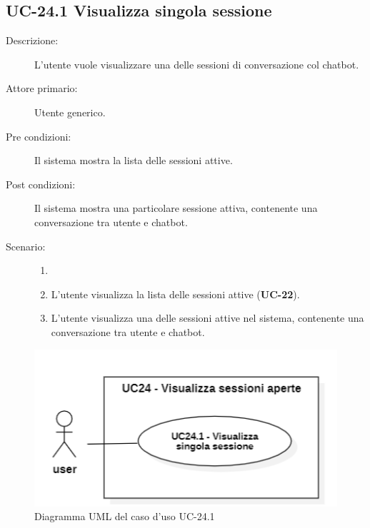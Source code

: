 \subsection{UC-24.1 Visualizza singola sessione}
\begin{description}
    \item[Descrizione:] L'utente vuole visualizzare una delle sessioni di conversazione col chatbot.
    \item[Attore primario:] Utente generico.
    \item[Pre condizioni:] Il sistema mostra la lista delle sessioni attive.
    \item[Post condizioni:] Il sistema mostra una particolare sessione attiva, contenente una conversazione tra utente e chatbot.
    \item[Scenario:] 
    \begin{enumerate}
        \item[]
        \item L'utente visualizza la lista delle sessioni attive (\textbf{UC-22}).
        \item L'utente visualizza una delle sessioni attive nel sistema, contenente una conversazione tra utente e chatbot.
    \end{enumerate}
\end{description}

\begin{figure}[H]
    \centering
    \includegraphics[width=0.8\linewidth]{UC24.1.PNG}
    \caption{Diagramma UML del caso d'uso UC-24.1}
    \label{fig:UC24.1}
\end{figure}

